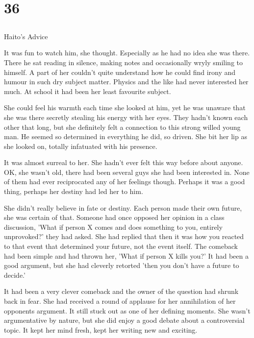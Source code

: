 \chapter{36}
\section{}
Haito's Advice  

It was fun to watch him, she thought.  Especially as he had no idea she was there.  There he sat reading in silence, making notes and occasionally wryly smiling to himself.  A part of her couldn't quite understand how he could find irony and humour in such dry subject matter.  Physics and the like had never interested her much.  At school it had been her least favourite subject.

She could feel his warmth each time she looked at him, yet he was unaware that she was there secretly stealing his energy with her eyes.  They hadn't known each other that long, but she definitely felt a connection to this strong willed young man.  He seemed so determined in everything he did, so driven.  She bit her lip as she looked on, totally infatuated with his presence.  

It was almost surreal to her.  She hadn't ever felt this way before about anyone.  OK, she wasn't old, there had been several guys she had been interested in.  None of them had ever reciprocated any of her feelings though.  Perhaps it was a good thing, perhaps her destiny had led her to him.

She didn't really believe in fate or destiny.  Each person made their own future, she was certain of that.  Someone had once opposed her opinion in a class discussion, 'What if person X comes and does something to you, entirely unprovoked?' they had asked.  She had replied that then it was how you reacted to that event that determined your future, not the event itself.  The comeback had been simple and had thrown her, 'What if person X kills you?'  It had been a good argument, but she had cleverly retorted 'then you don't have a future to decide.'

It had been a very clever comeback and the owner of the question had shrunk back in fear.  She had received a round of applause for her annihilation of her opponents argument.  It still stuck out as one of her defining moments.  She wasn't argumentative by nature, but she did enjoy a good debate about a controversial topic.  It kept her mind fresh, kept her writing new and exciting.

